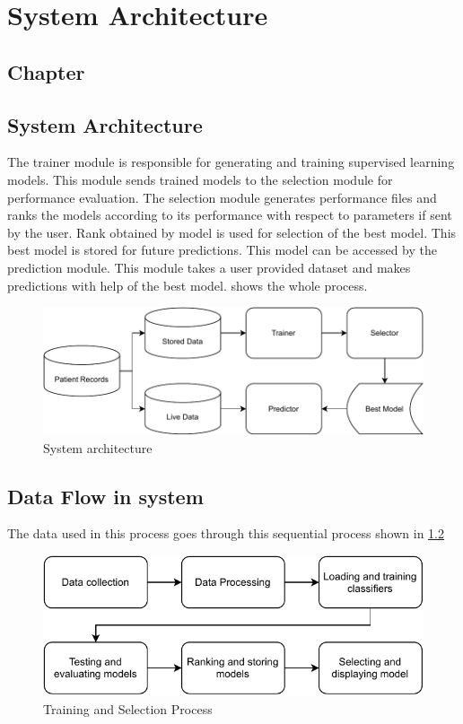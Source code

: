 \thispagestyle{fancy}
\chapter{System Architecture} \label{ch:system_architecture}
\section*{\centering Chapter \thechapter}
\section*{\centering System Architecture}

The trainer module is responsible for generating and training supervised learning models. This module sends trained models to the selection module for performance evaluation. The selection module generates performance files and ranks the models according to its performance with respect to parameters if sent by the user. Rank obtained by model is used for selection of the best model. This best model is stored for future predictions. This model can be accessed by the prediction module. This module takes a user provided dataset and makes predictions with help of the best model.  shows the whole process.

\begin{figure}[H]
  \centering
  \includegraphics[width=0.7\columnwidth]{media/architecture/System Architecture.pdf}
  \caption{System architecture}
  \label{fig:system_architecture}
\end{figure}

\section{Data Flow in system}

The data used in this process goes through this sequential process shown in \cref{fig:data_flow_in_system}

\begin{figure}[H]
  \centering
  \includegraphics[width=0.7\columnwidth]{media/website/architecture/Data_Flow_System.pdf}
  \caption{Training and Selection Process}
  \label{fig:data_flow_in_system}
\end{figure}

